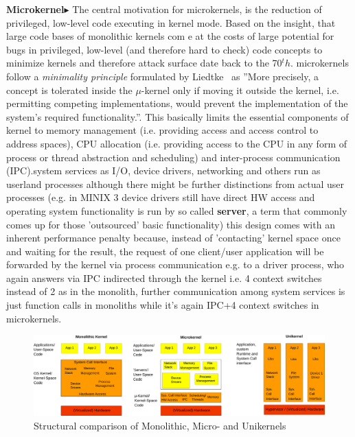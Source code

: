 \textbf{Microkernel$\blacktriangleright$} The central motivation for microkernels, is the reduction of privileged, low-level code executing in kernel mode. Based on the insight, that large code bases of monolithic kernels com e at the costs of large potential for bugs in privileged, low-level (and therefore hard to check) code concepts to minimize kernels and therefore attack surface date back to the 70$^th$. 
\means microkernels follow a \textit{minimality principle} formulated by Liedtke~\cite{jochen1995mu} as ''More precisely, a concept is tolerated inside the $\mu$-kernel only if moving it outside the kernel, i.e. permitting competing implementations, would prevent the
implementation of the system's required functionality.''. This basically limits the essential components of kernel to memory management (i.e. providing access and access control to address spaces), CPU allocation (i.e. providing access to the CPU in any form of process or thread abstraction and scheduling) and inter-process communication (IPC).\means system services as I/O, device drivers, networking and others run as userland processes although there might be further distinctions from actual user processes (e.g. in MINIX 3 device drivers still have direct HW access and operating system functionality is run by so called \textbf{server}, a term that commonly comes up for those 'outsourced' basic functionality) \means this design comes with an inherent performance penalty because, instead of 'contacting' kernel space once and waiting for the result, the request of one client/user application will be forwarded by the kernel via process communication e.g. to a driver process, who again answers via IPC indirected through the kernel i.e. 4 context switches instead of 2 as in the monolith, further communication among system services is just function calls in monoliths while it's again IPC+4 context switches in microkernels. 

\begin{figure}[H]
    \centering
    \includegraphics[scale= 0.36]{figures/kernels.png}
    \caption{Structural comparison of Monolithic, Micro- and Unikernels }
    \label{fig:kernels}
\end{figure}


